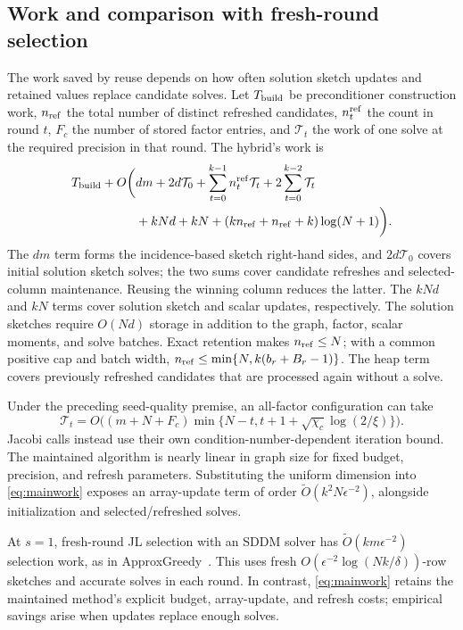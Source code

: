 \subsection{Work and comparison with fresh-round selection}
The work saved by reuse depends on how often solution sketch updates and
retained values replace candidate solves. Let $T_{\rm build}$ be
preconditioner construction work, $n_{\rm ref}$ the total number of
distinct refreshed candidates, $n_t^{\rm ref}$ the count in round $t$,
$F_c$ the number of stored factor entries, and $\mathcal T_t$ the
work of one solve at the required precision in that round.
The hybrid's work is
\begin{align}\label{eq:mainwork}
 T_{\rm build}+O\bigg(&dm+2d\mathcal T_0+
 \sum_{t=0}^{k-1}n_t^{\rm ref}\mathcal T_t+
 2\sum_{t=0}^{k-2}\mathcal T_t\\
 &+kNd+kN+(kn_{\rm ref}+n_{\rm ref}+k)\log(N+1)\bigg).\notag
\end{align}
The $dm$ term forms the incidence-based sketch right-hand sides,
and $2d\mathcal T_0$ covers initial solution sketch solves; the two sums
cover candidate refreshes and selected-column maintenance. Reusing
the winning column reduces the latter. The $kNd$ and $kN$ terms
cover solution sketch and scalar updates, respectively.
The solution sketches require $O(Nd)$ storage in addition to the graph,
factor, scalar moments, and solve batches. Exact retention makes
$n_{\rm ref}\leq N$; with a common positive cap and batch width,
$n_{\rm ref}\leq\min\{N,k(b_r+B_r-1)\}$.
The heap term covers previously refreshed candidates that are
processed again without a solve.

Under the preceding seed-quality premise, an all-factor
configuration can take
\[
 \mathcal T_t=O\bigl((m+N+F_c)
 \min\{N-t,t+1+\sqrt{\chi_c}\log(2/\xi)\}\bigr).
\]
Jacobi calls instead use their own condition-number-dependent
iteration bound. The maintained algorithm is nearly linear in graph
size for fixed budget, precision, and refresh parameters. Substituting
the uniform dimension into \eqref{eq:mainwork} exposes an array-update
term of order $\widetilde O(k^2N\epsilon^{-2})$, alongside
initialization and selected/refreshed solves.

At $s=1$, fresh-round JL selection with an SDDM solver has
$\widetilde O(km\epsilon^{-2})$ selection work, as in
ApproxGreedy~\cite{li2019,spielman2014}. This uses fresh
$O(\epsilon^{-2}\log(Nk/\delta))$-row sketches and accurate
solves in each round. In contrast, \eqref{eq:mainwork} retains
the maintained method's explicit budget, array-update, and refresh
costs; empirical savings arise when updates replace enough solves.

